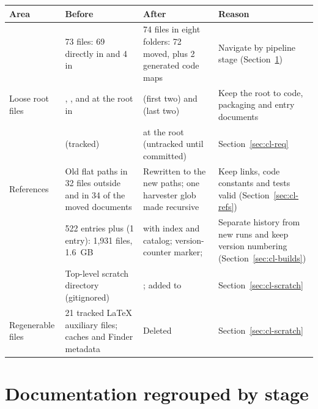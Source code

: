 {\small
\begin{longtable}{P{2.5cm}P{4.4cm}P{4.5cm}P{3.9cm}}
\toprule
Area & Before & After & Reason \\
\midrule
\endhead
{} & 73 files: 69 directly in  and 4 in  & 74 files in eight folders: 72 moved, plus 2 generated code maps & Navigate by pipeline stage (Section~\ref{sec:cl-docs}) \\
Loose root files & , ,  and  at the root in  &  (first two) and  (last two) & Keep the root to code, packaging and entry documents \\
 &  (tracked) &  at the root (untracked until committed) & Section~\ref{sec:cl-req} \\
References & Old flat paths in 32 files outside  and in 34 of the moved documents & Rewritten to the new paths; one harvester glob made recursive & Keep links, code constants and tests valid (Section~\ref{sec:cl-refs}) \\
 & 522 entries plus  (1 entry): 1,931 files, 1.6~GB &  with index and catalog; version-counter marker;  & Separate history from new runs and keep version numbering (Section~\ref{sec:cl-builds}) \\
 & Top-level scratch directory (gitignored) & ;  added to  & Section~\ref{sec:cl-scratch} \\
Regenerable files & 21 tracked LaTeX auxiliary files; caches and Finder metadata & Deleted & Section~\ref{sec:cl-scratch} \\
\bottomrule
\end{longtable}}

\section{Documentation regrouped by stage}\label{sec:cl-docs}

